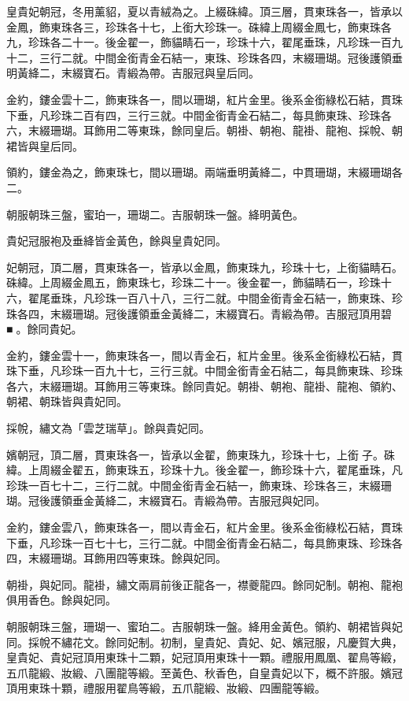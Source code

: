 \begin{pinyinscope}
皇貴妃朝冠，冬用薰貂，夏以青絨為之。上綴硃緯。頂三層，貫東珠各一，皆承以金鳳，飾東珠各三，珍珠各十七，上銜大珍珠一。硃緯上周綴金鳳七，飾東珠各九，珍珠各二十一。後金翟一，飾貓睛石一，珍珠十六，翟尾垂珠，凡珍珠一百九十二，三行二就。中間金銜青金石結一，東珠、珍珠各四，末綴珊瑚。冠後護領垂明黃絳二，末綴寶石。青緞為帶。吉服冠與皇后同。

金約，鏤金雲十二，飾東珠各一，間以珊瑚，紅片金里。後系金銜綠松石結，貫珠下垂，凡珍珠二百有四，三行三就。中間金銜青金石結二，每具飾東珠、珍珠各六，末綴珊瑚。耳飾用二等東珠，餘同皇后。朝褂、朝袍、龍褂、龍袍、採帨、朝裙皆與皇后同。

領約，鏤金為之，飾東珠七，間以珊瑚。兩端垂明黃絳二，中貫珊瑚，末綴珊瑚各二。

朝服朝珠三盤，蜜珀一，珊瑚二。吉服朝珠一盤。絳明黃色。

貴妃冠服袍及垂絳皆金黃色，餘與皇貴妃同。

妃朝冠，頂二層，貫東珠各一，皆承以金鳳，飾東珠九，珍珠十七，上銜貓睛石。硃緯。上周綴金鳳五，飾東珠七，珍珠二十一。後金翟一，飾貓睛石一，珍珠十六，翟尾垂珠，凡珍珠一百八十八，三行二就。中間金銜青金石結一，飾東珠、珍珠各四，末綴珊瑚。冠後護領垂金黃絳二，末綴寶石。青緞為帶。吉服冠頂用碧■。餘同貴妃。

金約，鏤金雲十一，飾東珠各一，間以青金石，紅片金里。後系金銜綠松石結，貫珠下垂，凡珍珠一百九十七，三行三就。中間金銜青金石結二，每具飾東珠、珍珠各六，末綴珊瑚。耳飾用三等東珠。餘同貴妃。朝褂、朝袍、龍褂、龍袍、領約、朝裙、朝珠皆與貴妃同。

採帨，繡文為「雲芝瑞草」。餘與貴妃同。

嬪朝冠，頂二層，貫東珠各一，皆承以金翟，飾東珠九，珍珠十七，上銜子。硃緯。上周綴金翟五，飾東珠五，珍珠十九。後金翟一，飾珍珠十六，翟尾垂珠，凡珍珠一百七十二，三行二就。中間金銜青金石結一，飾東珠、珍珠各三，末綴珊瑚。冠後護領垂金黃絳二，末綴寶石。青緞為帶。吉服冠與妃同。

金約，鏤金雲八，飾東珠各一，間以青金石，紅片金里。後系金銜綠松石結，貫珠下垂，凡珍珠一百七十七，三行二就。中間金銜青金石結二，每具飾東珠、珍珠各四，末綴珊瑚。耳飾用四等東珠。餘與妃同。

朝褂，與妃同。龍褂，繡文兩肩前後正龍各一，襟夔龍四。餘同妃制。朝袍、龍袍俱用香色。餘與妃同。

朝服朝珠三盤，珊瑚一、蜜珀二。吉服朝珠一盤。絳用金黃色。領約、朝裙皆與妃同。採帨不繡花文。餘同妃制。初制，皇貴妃、貴妃、妃、嬪冠服，凡慶賀大典，皇貴妃、貴妃冠頂用東珠十二顆，妃冠頂用東珠十一顆。禮服用鳳凰、翟鳥等緞，五爪龍緞、妝緞、八團龍等緞。至黃色、秋香色，自皇貴妃以下，概不許服。嬪冠頂用東珠十顆，禮服用翟鳥等緞，五爪龍緞、妝緞、四團龍等緞。


\end{pinyinscope}
